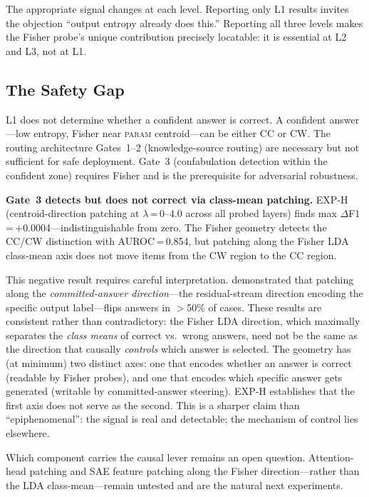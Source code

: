 \documentclass[11pt]{article}
\begin{document}
The appropriate signal changes at each level. Reporting only L1 results invites the
objection ``output entropy already does this.'' Reporting all three levels makes the
Fisher probe's unique contribution precisely locatable: it is essential at L2 and L3,
not at L1.

\subsection{The Safety Gap}

L1 does not determine whether a confident answer is correct. A confident answer---low
entropy, Fisher near \textsc{param} centroid---can be either CC or CW. The routing
architecture Gates~1--2 (knowledge-source routing) are necessary but not sufficient for
safe deployment. Gate~3 (confabulation detection within the confident zone) requires
Fisher and is the prerequisite for adversarial robustness.

\textbf{Gate~3 detects but does not correct via class-mean patching.}
EXP-H (centroid-direction patching at $\lambda$\,=\,0--4.0 across all probed layers)
finds max $\Delta$F1\,=\,$+$0.0004---indistinguishable from zero. The Fisher geometry
detects the CC/CW distinction with AUROC\,=\,0.854, but patching along the Fisher LDA
class-mean axis does not move items from the CW region to the CC region.

This negative result requires careful interpretation. \citet{cox2026decoding}
demonstrated that patching along the \emph{committed-answer direction}---the residual-stream
direction encoding the specific output label---flips answers in $>$50\% of cases.
These results are consistent rather than contradictory: the Fisher LDA direction, which
maximally separates the \emph{class means} of correct vs.\ wrong answers, need not be
the same as the direction that causally \emph{controls} which answer is selected. The
geometry has (at minimum) two distinct axes: one that encodes whether an answer is
correct (readable by Fisher probes), and one that encodes which specific answer gets
generated (writable by committed-answer steering). EXP-H establishes that the first
axis does not serve as the second. This is a sharper claim than ``epiphenomenal'':
the signal is real and detectable; the mechanism of control lies elsewhere.

Which component carries the causal lever remains an open question. Attention-head
patching and SAE feature patching along the Fisher direction---rather than the LDA
class-mean---remain untested and are the natural next experiments.
\end{document}
